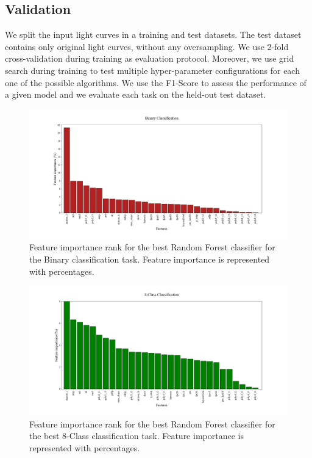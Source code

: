 \documentclass[a4paper,fleqn,usenatbib]{mnras}
\begin{document}
\subsection{Validation} \label{subsection_importances}

We split the input light curves in a training and test datasets. 
The test dataset contains only original light curves, without any
oversampling. 
We use 2-fold cross-validation during training as evaluation
protocol. 
Moreover, we use grid search during training to test multiple
hyper-parameter configurations for each one  of the possible
algorithms. 
We use the F1-Score to assess the performance of a given model and 
we evaluate each task on the held-out test dataset.


\begin{figure}
	\includegraphics[width=\textwidth]{binary_importances.png}
    \caption{Feature importance rank  for the best Random Forest
      classifier for the Binary classification task. 
      Feature importance is represented with percentages.} 
    \label{Importances-Binary}
\end{figure} 

\begin{figure}
	\includegraphics[width=\textwidth]{8class_importances.png}
    \caption{Feature importance rank for the best Random Forest
      classifier for the best 8-Class classification task. Feature
      importance is represented with percentages.} 
    \label{Importances-8-Class}
\end{figure}
\end{document}
